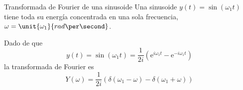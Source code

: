 \documentclass[presentation,aspectratio=169]{beamer}
\begin{document}
\begin{frame}[label={sec:org6fe2bdd}]{Transformada de Fourier de una sinusoide}
Una sinusoide \(y(t) = \sin(\omega_1 t)\) tiene toda su energía concentrada en una sola frecuencia, \(\omega=\unit{\omega_1}{rad\per\second}\). 
\begin{center}
\end{center}
Dado de que \[y(t) = \sin(\omega_1 t) = \frac{1}{2i} \left( \mathrm{e}^{i\omega_1 t} - \mathrm{e}^{-i \omega_1 t} \right)\]
la transformada de Fourier es
\[ Y(\omega) = \frac{1}{2i} \left( \delta(\omega_1 - \omega) - \delta(\omega_1 + \omega) \right)\]
\end{frame}
\end{document}
